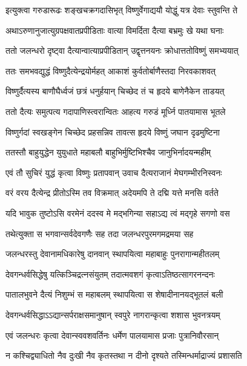 \twolineshloka
{इत्युक्त्वा गरुडारूढः शङ्खचक्रगदासिभृत्}
{विष्णुर्वेगाद्ययौ योद्धुं यत्र देवाः स्तुवन्ति ते} %

\twolineshloka
{अथाऽरुणानुजात्युग्रपक्षवातप्रपीडिताः}
{वात्या विमर्दिता दैत्या बभ्रमुः खे यथा घनाः} %

\twolineshloka
{ततो जलन्धरो दृष्ट्वा दैत्यान्वात्याप्रपीडितान्}
{उद्वृत्तनयनः क्रोधात्ततोविष्णुं समभ्ययात्} %

\twolineshloka
{ततः समभवद्युद्धं विष्णुदैत्येन्द्रयोर्महत्}
{आकाशं कुर्वतोर्बाणैस्तदा निरवकाशवत्} %

\twolineshloka
{विष्णुर्दैत्यस्य बाणौघैर्ध्वजं छत्रं धनुर्हयान्}
{चिच्छेद तं च हृदये बाणेनैकेन ताडयत्} %

\twolineshloka
{ततो दैत्यः समुत्पत्य गदापाणिस्त्वरान्वितः}
{आहत्य गरुडं मूर्ध्नि पातयामास भूतले} %

\twolineshloka
{विष्णुर्गदां स्वखङ्गेन चिच्छेद प्रहसन्निव}
{तावत्स हृदये विष्णुं जघान दृढमुष्टिना} %

\twolineshloka
{ततस्तौ बाहुयुद्धेन युयुधाते महाबलौ}
{बाहुभिर्मुष्टिभिश्चैव जानुभिर्नादयन्महीम्} %

\twolineshloka
{एवं तौ सुचिरं युद्धं कृत्वा विष्णुः प्रतापवान्}
{उवाच दैत्यराजानं मेघगम्भीरनिस्वनः} %


\twolineshloka
{वरं वरय दैत्येन्द्र प्रीतोऽस्मि तव विक्रमात्}
{अदेयमपि ते दद्मि यत्ते मनसि वर्तते} %

\twolineshloka
{यदि भावुक तुष्टोऽसि वरमेनं ददस्व मे}
{मद्भगिन्या सहाऽद्य त्वं मद्गृहे सगणो वस} %


\twolineshloka
{तथेत्युक्ता स भगवान्सर्वदेवगणैः सह}
{तदा जलन्धरपुरमगमद्रमया सह} %

\twolineshloka
{जलन्धरस्तु देवानामधिकारेषु दानवान्}
{स्थापयित्वा महाबाहुः पुनरागान्महीतलम्} %

\twolineshloka
{देवगन्धर्वसिद्धेषु यत्किञ्चिद्रत्नसंयुतम्}
{तदात्मवशगं कृत्वाऽतिष्ठत्सागरनन्दनः} %

\twolineshloka
{पातालभुवने दैत्यं निशुम्भं स महाबलम्}
{स्थापयित्वा स शेषादीनानयद्भूतलं बली} %

\twolineshloka
{देवगन्धर्वसिद्धाऽऽद्यान्सर्पराक्षसमानुषान्}
{स्वपुरे नागरान्कृत्वा शशास भुवनत्रयम्} %

\twolineshloka
{एवं जलन्धरः कृत्वा देवान्स्ववशवर्तिनः}
{धर्मेण पालयामास प्रजाः पुत्रानिवौरसान्} %

\twolineshloka
{न कश्चिद्व्याधितो नैव दुःखी नैव कृतस्तथा}
{न दीनो दृश्यते तस्मिन्धर्माद्राज्यं प्रशासति} %

